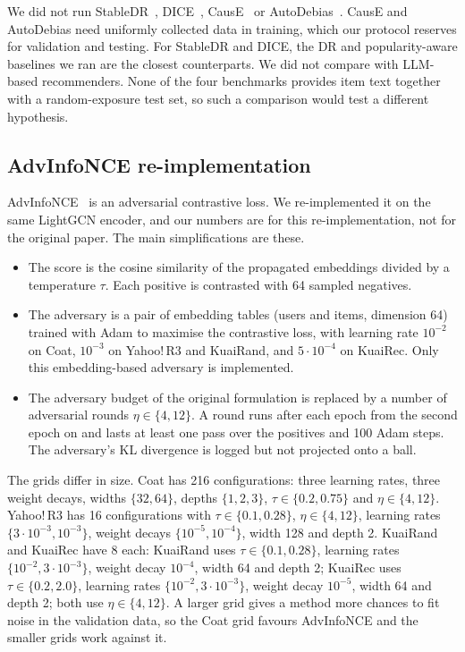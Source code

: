 We did not run StableDR~\citep{li2023stabledr}, DICE~\citep{zheng2021dice}, CausE~\citep{bonner2018cause}
or AutoDebias~\citep{chen2021autodebias}. CausE and AutoDebias need uniformly collected data in
training, which our protocol reserves for validation and testing. For StableDR and DICE, the DR and
popularity-aware baselines we ran are the closest counterparts. We did not compare with LLM-based
recommenders. None of the four benchmarks provides item text together with a random-exposure test
set, so such a comparison would test a different hypothesis.

\subsection{AdvInfoNCE re-implementation}\label{sec:advsetup}

AdvInfoNCE~\citep{zhang2023advinfonce} is an adversarial contrastive loss. We re-implemented it on
the same LightGCN encoder, and our numbers are for this re-implementation, not for the original
paper. The main simplifications are these.

\begin{itemize}
\item The score is the cosine similarity of the propagated embeddings divided by a temperature
$\tau$. Each positive is contrasted with 64 sampled negatives.
\item The adversary is a pair of embedding tables (users and items, dimension 64) trained with Adam
to maximise the contrastive loss, with learning rate $10^{-2}$ on Coat, $10^{-3}$ on Yahoo!\,R3 and
KuaiRand, and $5\cdot10^{-4}$ on KuaiRec. Only this embedding-based adversary is implemented.
\item The adversary budget of the original formulation is replaced by a number of adversarial rounds
$\eta\in\{4,12\}$. A round runs after each epoch from the second epoch on and lasts at least one
pass over the positives and 100 Adam steps. The adversary's KL divergence is logged but not
projected onto a ball.
\end{itemize}

The grids differ in size. Coat has 216 configurations: three learning rates, three weight decays,
widths $\{32,64\}$, depths $\{1,2,3\}$, $\tau\in\{0.2,0.75\}$ and $\eta\in\{4,12\}$. Yahoo!\,R3 has 16
configurations with $\tau\in\{0.1,0.28\}$, $\eta\in\{4,12\}$, learning rates $\{3\cdot10^{-3},10^{-3}\}$,
weight decays $\{10^{-5},10^{-4}\}$, width 128 and depth 2. KuaiRand and KuaiRec have 8 each: KuaiRand
uses $\tau\in\{0.1,0.28\}$, learning rates $\{10^{-2},3\cdot10^{-3}\}$, weight decay $10^{-4}$, width 64
and depth 2; KuaiRec uses $\tau\in\{0.2,2.0\}$, learning rates $\{10^{-2},3\cdot10^{-3}\}$, weight decay
$10^{-5}$, width 64 and depth 2; both use $\eta\in\{4,12\}$. A larger grid gives a method more chances to
fit noise in the validation data, so the Coat grid favours AdvInfoNCE and the smaller grids work
against it.

